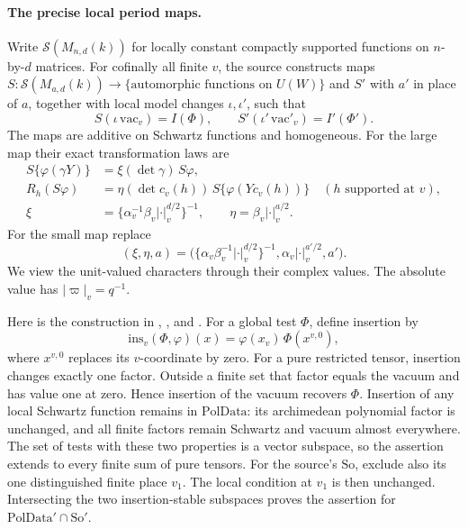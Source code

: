 \paragraph{The precise local period maps.}
Write \(\mathcal S(M_{n,d}(k))\) for locally constant compactly
supported functions on \(n\)-by-\(d\) matrices.
For cofinally all finite \(v\), the source constructs maps
\(S:\mathcal S(M_{a,d}(k))\to\{\text{automorphic functions on }U(W)\}\)
and \(S'\) with \(a'\) in place of \(a\), together with local
model changes \(\iota,\iota'\), such that
\[
 S(\iota\,\mathrm{vac}_v)=I(\Phi),\qquad
 S'(\iota'\,\mathrm{vac}'_v)=I'(\Phi').
 \tag{AK2}\label{eq:sr-source-local-period-values}
\]
The maps are additive on Schwartz functions and homogeneous.
For the large map their exact transformation laws are
\[
 \begin{split}
 S\{\varphi(\gamma Y)\}
       &=\xi(\det\gamma)\,S\varphi,\\
 R_h(S\varphi)&=\eta(\det c_v(h))\,
                     S\{\varphi(Yc_v(h))\}
                   \quad(h\text{ supported at }v),\\
 \xi&=\{\alpha_v^{-1}\beta_v|\cdot|_v^{d/2}\}^{-1},
 \qquad \eta=\beta_v|\cdot|_v^{a/2}.
 \end{split} \tag{AK3}\label{eq:sr-source-local-period-laws}
\]
For the small map replace
\[
 (\xi,\eta,a)=
 \bigl(\{\alpha_v\beta_v^{-1}|\cdot|_v^{d/2}\}^{-1},
              \alpha_v|\cdot|_v^{a'/2},a'\bigr).
 \tag{AK4}\label{eq:sr-source-small-local-period-laws}
\]
We view the unit-valued characters through their complex values.
The absolute value has \(|\varpi|_v=q^{-1}\).

Here is the construction in ,
, and .
For a global test \(\Phi\), define insertion by
\[
 \mathrm{ins}_v(\Phi,\varphi)(x)
   =\varphi(x_v)\,\Phi(x^{v,0}),
\]
where \(x^{v,0}\) replaces its \(v\)-coordinate by zero.
For a pure restricted tensor, insertion changes exactly one factor.
Outside a finite set that factor equals the vacuum and has value
one at zero. Hence insertion of the vacuum recovers \(\Phi\).
Insertion of any local Schwartz function remains in
\(\mathrm{PolData}\): its archimedean polynomial factor is unchanged,
and all finite factors remain Schwartz and vacuum almost everywhere.
The set of tests with these two properties is a vector subspace,
so the assertion extends to every finite sum of pure tensors.
For the source's \(\mathrm{So}\), exclude also its one distinguished
finite place \(v_1\). The local condition at \(v_1\) is then unchanged.
Intersecting the two insertion-stable subspaces proves the assertion
for \(\mathrm{PolData}'\cap\mathrm{So}'\).

